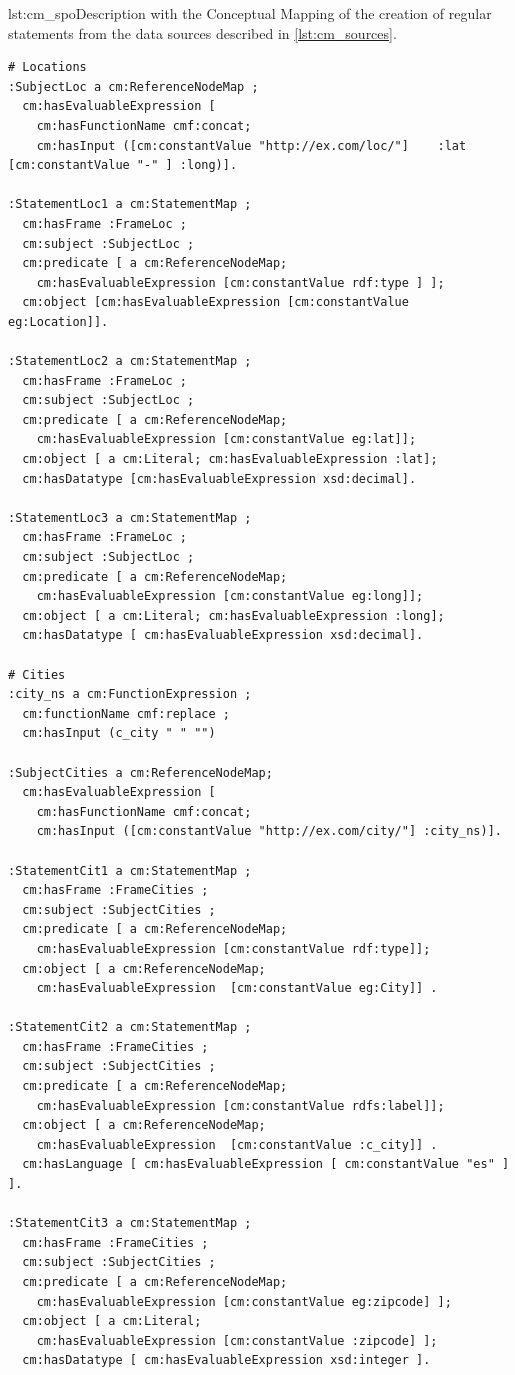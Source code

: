 \begin{captionedlisting}{lst:cm_spo}{Description with the Conceptual Mapping of the creation of regular statements from the data sources described in \cref{lst:cm_sources}.}
\centering
{\begin{lstlisting}[language=concm,firstnumber=1]
# Locations
:SubjectLoc a cm:ReferenceNodeMap ;
  cm:hasEvaluableExpression [
    cm:hasFunctionName cmf:concat; 
    cm:hasInput ([cm:constantValue "http://ex.com/loc/"]    :lat [cm:constantValue "-" ] :long)].

:StatementLoc1 a cm:StatementMap ;
  cm:hasFrame :FrameLoc ;
  cm:subject :SubjectLoc ;
  cm:predicate [ a cm:ReferenceNodeMap; 
    cm:hasEvaluableExpression [cm:constantValue rdf:type ] ];
  cm:object [cm:hasEvaluableExpression [cm:constantValue eg:Location]].

:StatementLoc2 a cm:StatementMap ;
  cm:hasFrame :FrameLoc ;
  cm:subject :SubjectLoc ;
  cm:predicate [ a cm:ReferenceNodeMap; 
    cm:hasEvaluableExpression [cm:constantValue eg:lat]];
  cm:object [ a cm:Literal; cm:hasEvaluableExpression :lat];
  cm:hasDatatype [cm:hasEvaluableExpression xsd:decimal].

:StatementLoc3 a cm:StatementMap ;
  cm:hasFrame :FrameLoc ;
  cm:subject :SubjectLoc ;
  cm:predicate [ a cm:ReferenceNodeMap; 
    cm:hasEvaluableExpression [cm:constantValue eg:long]];
  cm:object [ a cm:Literal; cm:hasEvaluableExpression :long];
  cm:hasDatatype [ cm:hasEvaluableExpression xsd:decimal].
    
# Cities
:city_ns a cm:FunctionExpression ;
  cm:functionName cmf:replace ;
  cm:hasInput (c_city " " "")

:SubjectCities a cm:ReferenceNodeMap;
  cm:hasEvaluableExpression [
    cm:hasFunctionName cmf:concat; 
    cm:hasInput ([cm:constantValue "http://ex.com/city/"] :city_ns)].

:StatementCit1 a cm:StatementMap ;
  cm:hasFrame :FrameCities ;
  cm:subject :SubjectCities ;
  cm:predicate [ a cm:ReferenceNodeMap; 
    cm:hasEvaluableExpression [cm:constantValue rdf:type]];
  cm:object [ a cm:ReferenceNodeMap; 
    cm:hasEvaluableExpression  [cm:constantValue eg:City]] .

:StatementCit2 a cm:StatementMap ;
  cm:hasFrame :FrameCities ;
  cm:subject :SubjectCities ;
  cm:predicate [ a cm:ReferenceNodeMap; 
    cm:hasEvaluableExpression [cm:constantValue rdfs:label]];
  cm:object [ a cm:ReferenceNodeMap; 
    cm:hasEvaluableExpression  [cm:constantValue :c_city]] .
  cm:hasLanguage [ cm:hasEvaluableExpression [ cm:constantValue "es" ] ].

:StatementCit3 a cm:StatementMap ;
  cm:hasFrame :FrameCities ;
  cm:subject :SubjectCities ;
  cm:predicate [ a cm:ReferenceNodeMap; 
    cm:hasEvaluableExpression [cm:constantValue eg:zipcode] ];
  cm:object [ a cm:Literal;
    cm:hasEvaluableExpression [cm:constantValue :zipcode] ];
  cm:hasDatatype [ cm:hasEvaluableExpression xsd:integer ].
\end{lstlisting}}
\end{captionedlisting}


